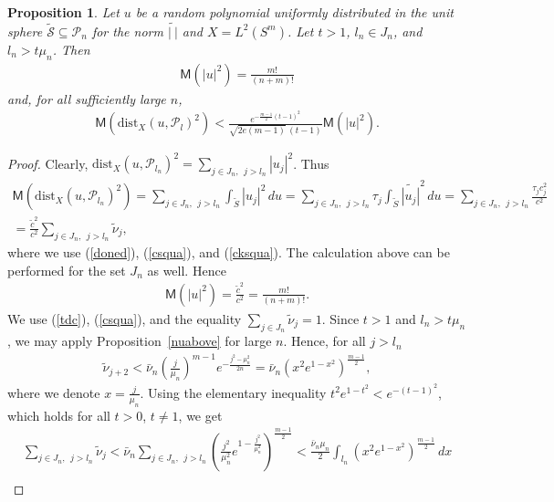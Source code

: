 \documentclass[10pt]{amsart}
\newtheorem{proposition}{Proposition}
\theoremstyle{remark}
\let\td=\tilde
\let\wtd=\widetilde
\begin{document}
\begin{proposition}\label{approx}
Let $u$ be a random polynomial uniformly distributed in the unit
sphere $\wtd{\mathcal{S}}\subseteq{\mathcal{P}}_n$  for the norm $\wtd{|\ |}$ and
$X=L^2(S^m)$. Let $t>1$, $l_n\in J_n$, and $l_n>t\mu_n$. Then
\begin{eqnarray*}
{{\mathsf{M}}}(|u|^2)=\frac{m!}{(n+m)!}
\end{eqnarray*}
and, for all sufficiently large $n$,
\begin{eqnarray*}
{{\mathsf{M}}}({\mathrm{dist}}_X(u,{\mathcal{P}}_l)^2)<
\frac{e^{-\frac{m-1}{2}(t-1)^2}}{\sqrt{2e(m-1)}\,(t-1)}
{{\mathsf{M}}}(|u|^2).
\end{eqnarray*}
\end{proposition}
\begin{proof}
Clearly, ${\mathrm{dist}}_X(u,{\mathcal{P}}_{l_n})^2=\sum\limits_{j\in
J_n,~~j>l_n}|u_j|^2$. Thus
\begin{eqnarray*}
{{\mathsf{M}}}\left({\mathrm{dist}}_X(u,{\mathcal{P}}_{l_n})^2\right)=\sum\limits_{j\in
J_n,~~j>l_n}\int_{\wtd S}|u_j|^2\,du=\sum\limits_{j\in
J_n,~~j>l_n}\tau_j\int_{\wtd S}\wtd{|u_j|}^2\,du
=\sum\limits_{j\in
J_n,~~j>l_n}\frac{\tau_jc_j^2}{c^2}\\
=\frac{\td c^2}{c^2}\sum\limits_{j\in J_n,~~j>l_n}\td\nu_j,
\end{eqnarray*}
where we use (\ref{doned}), (\ref{csqua}), and (\ref{cksqua}).
The calculation above can be performed for the set $J_n$ as well. Hence
\begin{eqnarray*}
{{\mathsf{M}}}\left(|u|^2\right)=\frac{\td c^2}{c^2}=\frac{m!}{(n+m)!}.
\end{eqnarray*}
We use  (\ref{tdc}), (\ref{csqua}), and the equality  $\sum_{j\in
J_n}\td\nu_j=1$. Since $t>1$ and $l_n>t\mu_n$, we may apply
Proposition~\ref{nuabove} for large $n$. Hence, for all $j>l_n$
\begin{eqnarray*}
\td\nu_{j+2}<\bar\nu_n
\left(\frac{j}{\mu_n}\right)^{m-1}e^{-\frac{j^2-\mu_n^2}{2n}}
=\bar\nu_n\left(x^2e^{1-x^2}\right)^{\frac{m-1}{2}},
\end{eqnarray*}
where we denote $x=\frac{j}{\mu_n}$. Using the elementary
inequality
$t^2e^{1-t^2}<e^{-(t-1)^2}$,
which holds for all $t>0$, $t\neq1$, we get
\begin{eqnarray*}
\sum\limits_{j\in J_n,~~j>l_n}\td\nu_j <{}\bar\nu_n
\sum\limits_{j\in J_n,~~j>l_n}
\left(\frac{j^2}{\mu_n^2}e^{1-\frac{j^2}{\mu_n^2}}\right)^{\frac{m-1}{2}}
<\frac{\bar\nu_n\mu_n}{2}\int_{l_n}
\left(x^2e^{1-x^2}\right)^{\frac{m-1}{2}}\,dx
\\

\end{eqnarray*}
\end{proof}
\end{document}
